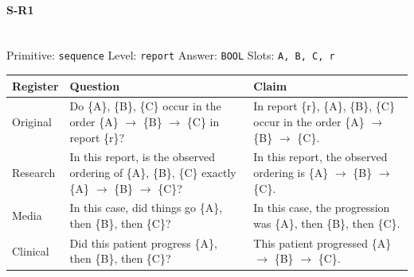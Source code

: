 \documentclass[11pt]{article}
\begin{document}
\paragraph{\textbf{S-R1}}\mbox{}\\
Primitive: \texttt{sequence} \quad Level: \texttt{report} \quad Answer: \texttt{BOOL} \quad Slots: \texttt{A, B, C, r}\\[2pt]
\begin{tabularx}{\linewidth}{@{}l L L@{}}
\toprule
\textbf{Register} & \textbf{Question} & \textbf{Claim} \\
\midrule
Original & Do \{A\}, \{B\}, \{C\} occur in the order \{A\} $\rightarrow$  \{B\} $\rightarrow$  \{C\} in report \{r\}? & In report \{r\}, \{A\}, \{B\}, \{C\} occur in the order \{A\} $\rightarrow$  \{B\} $\rightarrow$  \{C\}. \\
Research & In this report, is the observed ordering of \{A\}, \{B\}, \{C\} exactly \{A\} $\rightarrow$  \{B\} $\rightarrow$  \{C\}? & In this report, the observed ordering is \{A\} $\rightarrow$  \{B\} $\rightarrow$  \{C\}. \\
Media & In this case, did things go \{A\}, then \{B\}, then \{C\}? & In this case, the progression was \{A\}, then \{B\}, then \{C\}. \\
Clinical & Did this patient progress \{A\}, then \{B\}, then \{C\}? & This patient progressed \{A\} $\rightarrow$  \{B\} $\rightarrow$  \{C\}. \\
\bottomrule
\end{tabularx}
\vspace{4pt}
\end{document}
